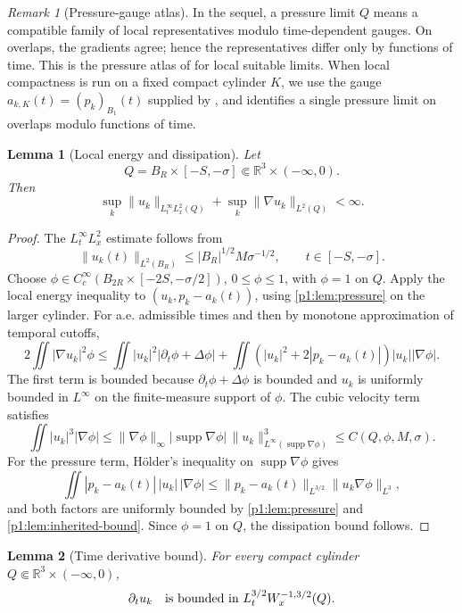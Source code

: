 \documentclass[11pt]{amsart}
\theoremstyle{plain}
\newtheorem{lemma}[lemma]{Lemma}
\theoremstyle{definition}
\theoremstyle{remark}
\newtheorem{remark}[remark]{Remark}
\numberwithin{equation}{section}
\newcommand{\R}{\mathbb R}
\newcommand{\supp}{\operatorname{supp}}
\begin{document}
\begin{remark}[Pressure-gauge atlas]
\label{p1:rem:pressure-atlas}
In the sequel, a pressure limit \(Q\) means a compatible family of local
representatives modulo time-dependent gauges.  On overlaps, the gradients
agree; hence the representatives differ only by functions of time.  This is
the pressure atlas of  for local suitable limits.
When local
compactness is run on a fixed compact cylinder \(K\), we use the gauge
\(a_{k,K}(t)=(p_k)_{B_1}(t)\) supplied by , and
 identifies a single pressure limit on
overlaps modulo functions of time.
\end{remark}

\begin{lemma}[Local energy and dissipation]\label{p1:lem:energy-diss}
Let
\[
   Q=B_R\times[-S,-\sigma]\Subset\R^3\times(-\infty,0).
\]
Then
\[
   \sup_k\|u_k\|_{L^\infty_tL^2_x(Q)}
   +\sup_k\|\nabla u_k\|_{L^2(Q)}<\infty .
\]
\end{lemma}

\begin{proof}
The \(L^\infty_tL^2_x\) estimate follows from
\[
   \|u_k(t)\|_{L^2(B_R)}
   \le |B_R|^{1/2}M\sigma^{-1/2},
   \qquad t\in[-S,-\sigma].
\]
Choose \(\phi\in C_c^\infty(B_{2R}\times[-2S,-\sigma/2])\), \(0\le\phi\le1\),
with \(\phi=1\) on \(Q\).  Apply the local energy inequality to
\((u_k,p_k-a_k(t))\), using \cref{p1:lem:pressure} on the larger cylinder.  For
a.e. admissible times and then by monotone approximation of temporal cutoffs,
\[
   2\iint |\nabla u_k|^2\phi
   \le
   \iint |u_k|^2|\partial_t\phi+\Delta\phi|
   +\iint (|u_k|^2+2|p_k-a_k(t)|)|u_k||\nabla\phi|.
\]
The first term is bounded because \(\partial_t\phi+\Delta\phi\) is bounded
and \(u_k\) is uniformly bounded in \(L^\infty\) on the finite-measure support
of \(\phi\).  The cubic velocity term satisfies
\[
   \iint |u_k|^3|\nabla\phi|
   \le
   \|\nabla\phi\|_\infty
   |\supp\nabla\phi|\,\|u_k\|_{L^\infty(\supp\nabla\phi)}^3
   \le C(Q,\phi,M,\sigma).
\]
For the pressure term, H\"older's inequality on \(\supp\nabla\phi\) gives
\[
   \iint |p_k-a_k(t)|\,|u_k|\,|\nabla\phi|
   \le
   \|p_k-a_k(t)\|_{L^{3/2}}
   \|u_k\nabla\phi\|_{L^3},
\]
and both factors are uniformly bounded by \cref{p1:lem:pressure} and
\cref{p1:lem:inherited-bound}.  Since \(\phi=1\) on \(Q\), the dissipation bound
follows.
\end{proof}

\begin{lemma}[Time derivative bound]\label{p1:lem:time-derivative}
For every compact cylinder \(Q\Subset\R^3\times(-\infty,0)\),
\[
   \partial_tu_k
   \quad\hbox{is bounded in }L^{3/2}_tW^{-1,3/2}_x(Q).
\]
\end{lemma}
\end{document}
